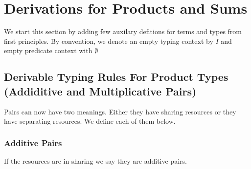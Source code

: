 \chapter{Derivations for Products and Sums}
We start this section by adding few auxilary defitions for terms and types from first principles.
By convention, we denote an empty typing context by $I$ and empty predicate context with $\emptyset$

\section{Derivable Typing Rules For Product Types (Addiditive and Multiplicative Pairs)}\label{sec:pairs-deriv}
Pairs can now have two meanings. Either they have sharing resources or they have separating resources. We define each
of them below.

\subsection{Additive Pairs}\label{subsec:add-pairs-deriv}
If the resources are in sharing we say they are additive pairs.

